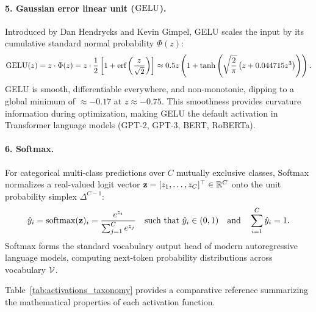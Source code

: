 \documentclass[../../main.tex]{subfiles}
\begin{document}
\paragraph{5. Gaussian error linear unit ($\operatorname{\mathrm{GELU}}$).}
Introduced by Dan Hendrycks and Kevin Gimpel, GELU scales the input by its cumulative standard normal probability $\Phi(z)$:
\begin{equation}
\label{eq:gelu_def}
\operatorname{\mathrm{GELU}}(z) = z \cdot \Phi(z) = z \cdot \frac{1}{2} \left[ 1 + \text{erf}\left( \frac{z}{\sqrt{2}} \right) \right] \approx 0.5z \left( 1 + \tanh\left( \sqrt{\frac{2}{\pi}} \left( z + 0.044715 z^3 \right) \right) \right).
\end{equation}
GELU is smooth, differentiable everywhere, and non-monotonic, dipping to a global minimum of $\approx -0.17$ at $z \approx -0.75$. This smoothness provides curvature information during optimization, making GELU the default activation in Transformer language models (GPT-2, GPT-3, BERT, RoBERTa).

\paragraph{6. Softmax.}
For categorical multi-class predictions over $C$ mutually exclusive classes, Softmax normalizes a real-valued logit vector $\mathbf{z} = [z_1, \dots, z_C]^\top \in \mathbb{R}^C$ onto the unit probability simplex $\Delta^{C-1}$:
\begin{equation}
\label{eq:softmax_def}
\hat{y}_i = \operatorname{\mathrm{softmax}}(\mathbf{z})_i = \frac{e^{z_i}}{\sum_{j=1}^C e^{z_j}} \quad \text{such that } \hat{y}_i \in (0, 1) \quad \text{and} \quad \sum_{i=1}^C \hat{y}_i = 1.
\end{equation}
Softmax forms the standard vocabulary output head of modern autoregressive language models, computing next-token probability distributions across vocabulary $\mathcal{V}$.

Table~\ref{tab:activations_taxonomy} provides a comparative reference summarizing the mathematical properties of each activation function.
\end{document}
